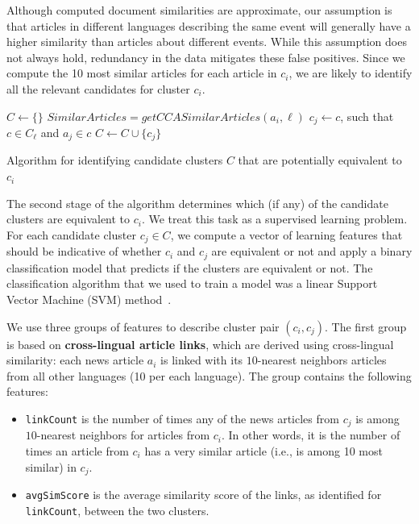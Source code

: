 \documentclass[twoside,11pt]{article}
\begin{document}
Although computed document similarities are approximate, our  assumption is that articles in different languages describing the same event will generally have a higher similarity than articles about different events. While this assumption does not always hold, redundancy in the data mitigates these false positives. Since we compute the 10 most similar articles for each article in $c_i$, we are likely to identify all the relevant candidates for cluster $c_i$.

\begin{algorithm}[t!]
$C \leftarrow \{\}$\;
 {
     {
        $SimilarArticles = getCCASimilarArticles(a_i, \ell)$\;
         {
            $c_j \leftarrow c$, such that $c \in C_\ell$ and $a_j \in c$\;
            $C \leftarrow C \cup \{ c_j \}$\;
        }
    }
}
\caption{Algorithm for identifying candidate clusters $C$ that are potentially equivalent to $c_i$}
\label{cluster_merge_algo1}
\end{algorithm}

The second stage of the algorithm determines which (if any) of the candidate clusters are equivalent to $c_i$. We treat this task as a supervised learning problem. For each candidate cluster $c_j \in C$, we compute a vector of learning features that should be indicative of whether $c_i$ and $c_j$ are equivalent or not and apply a binary classification model that predicts if the clusters are equivalent or not. The classification algorithm that we used to train a model was a linear Support Vector Machine (SVM) method~.

We use three groups of features to describe cluster pair $(c_i, c_j)$. The first group is based on {\bf cross-lingual article links}, which are derived using cross-lingual similarity: each news article $a_i$ is linked with its $10$-nearest neighbors articles from all other languages (10 per each language). The group contains the following features:

\begin{itemize}
\item \texttt{linkCount} is the number of times any of the news articles from $c_j$ is among $10$-nearest neighbors for articles from $c_i$. In other words, it is the number of times an article from $c_i$ has a very similar article (i.e., is among 10 most similar) in $c_j$.
\item \texttt{avgSimScore} is the average similarity score of the links, as identified for \texttt{linkCount}, between the two clusters.
\end{itemize}
\end{document}
